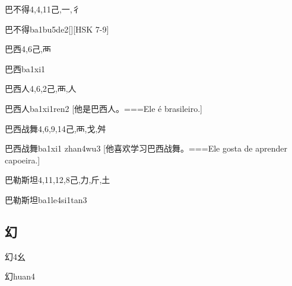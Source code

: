 \begin{Entry}{巴不得}{4,4,11}{⼰,⼀,⼻}
  \begin{Phonetics}{巴不得}{ba1bu5de2}[][HSK 7-9]
  \end{Phonetics}
\end{Entry}

\begin{Entry}{巴西}{4,6}{⼰,⾑}
  \begin{Phonetics}{巴西}{ba1xi1}
  \end{Phonetics}
\end{Entry}

\begin{Entry}{巴西人}{4,6,2}{⼰,⾑,⼈}
  \begin{Phonetics}{巴西人}{ba1xi1ren2}
    [他是巴西人。===Ele é brasileiro.]
  \end{Phonetics}
\end{Entry}

\begin{Entry}{巴西战舞}{4,6,9,14}{⼰,⾑,⼽,⾇}
  \begin{Phonetics}{巴西战舞}{ba1xi1 zhan4wu3}
    [他喜欢学习巴西战舞。===Ele gosta de aprender capoeira.]
  \end{Phonetics}
\end{Entry}

\begin{Entry}{巴勒斯坦}{4,11,12,8}{⼰,⼒,⽄,⼟}
  \begin{Phonetics}{巴勒斯坦}{ba1le4si1tan3}
  \end{Phonetics}
\end{Entry}

\subsection*{幻}

\begin{Entry}{幻}{4}{⼳}
  \begin{Phonetics}{幻}{huan4}
  \end{Phonetics}
\end{Entry}

